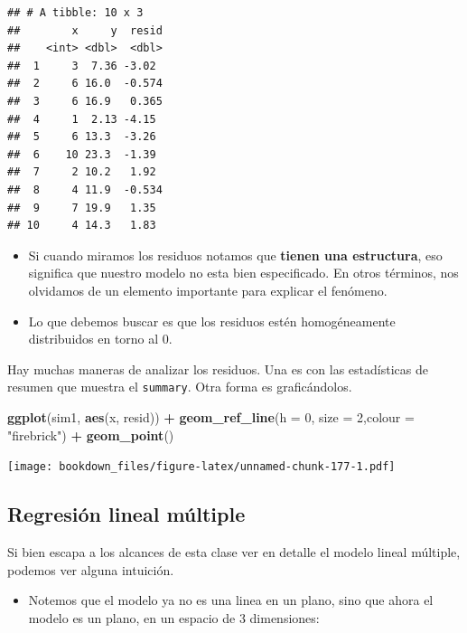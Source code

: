 \documentclass[]{book}
\newenvironment{Shaded}{\begin{snugshade}}{\end{snugshade}}
\newcommand{\DataTypeTok}[1]{\textcolor[rgb]{0.13,0.29,0.53}{#1}}
\newcommand{\DecValTok}[1]{\textcolor[rgb]{0.00,0.00,0.81}{#1}}
\newcommand{\KeywordTok}[1]{\textcolor[rgb]{0.13,0.29,0.53}{\textbf{#1}}}
\newcommand{\NormalTok}[1]{#1}
\newcommand{\OperatorTok}[1]{\textcolor[rgb]{0.81,0.36,0.00}{\textbf{#1}}}
\newcommand{\StringTok}[1]{\textcolor[rgb]{0.31,0.60,0.02}{#1}}
\providecommand{\tightlist}{%
  \setlength{\itemsep}{0pt}\setlength{\parskip}{0pt}}
\begin{document}
\begin{verbatim}
## # A tibble: 10 x 3
##        x     y  resid
##    <int> <dbl>  <dbl>
##  1     3  7.36 -3.02 
##  2     6 16.0  -0.574
##  3     6 16.9   0.365
##  4     1  2.13 -4.15 
##  5     6 13.3  -3.26 
##  6    10 23.3  -1.39 
##  7     2 10.2   1.92 
##  8     4 11.9  -0.534
##  9     7 19.9   1.35 
## 10     4 14.3   1.83
\end{verbatim}

\begin{itemize}
\tightlist
\item
  Si cuando miramos los residuos notamos que \textbf{tienen una estructura}, eso significa que nuestro modelo no esta bien especificado. En otros términos, nos olvidamos de un elemento importante para explicar el fenómeno.
\item
  Lo que debemos buscar es que los residuos estén homogéneamente distribuidos en torno al 0.
\end{itemize}

Hay muchas maneras de analizar los residuos. Una es con las estadísticas de resumen que muestra el \texttt{summary}. Otra forma es graficándolos.

\begin{Shaded}
\begin{Highlighting}[]
\KeywordTok{ggplot}\NormalTok{(sim1, }\KeywordTok{aes}\NormalTok{(x, resid)) }\OperatorTok{+}\StringTok{ }
\StringTok{  }\KeywordTok{geom_ref_line}\NormalTok{(}\DataTypeTok{h =} \DecValTok{0}\NormalTok{, }\DataTypeTok{size =} \DecValTok{2}\NormalTok{,}\DataTypeTok{colour =} \StringTok{"firebrick"}\NormalTok{) }\OperatorTok{+}
\StringTok{  }\KeywordTok{geom_point}\NormalTok{() }
\end{Highlighting}
\end{Shaded}

\texttt{[image: bookdown\_files/figure-latex/unnamed-chunk-177-1.pdf]}

\hypertarget{regresion-lineal-multiple}{%
\subsection{Regresión lineal múltiple}\label{regresion-lineal-multiple}}

Si bien escapa a los alcances de esta clase ver en detalle el modelo lineal múltiple, podemos ver alguna intuición.

\begin{itemize}
\tightlist
\item
  Notemos que el modelo ya no es una linea en un plano, sino que ahora el modelo es un plano, en un espacio de 3 dimensiones:
\end{itemize}
\end{document}

